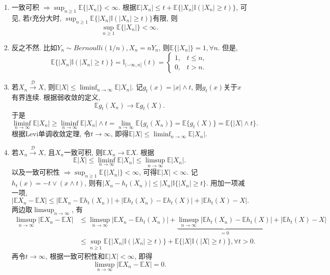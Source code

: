 \documentclass[UTF8, a4paper]{article}
\begin{document}
\begin{enumerate}
    \item 一致可积 \(\Rightarrow \sup_{n\geq 1} \mathbb{E}\{|X_n|\} < \infty.\) 根据\(\mathbb{E}|X_n| \leq t + \mathbb{E}\{|X_n| \mathbb{I}(|X_n| \geq t)\}\), 
    可见, 若\(t\)充分大时, \(\sup_{n\geq 1} \mathbb{E}\{|X_n| \mathbb{I}(|X_n| \geq t)\}\)有限, 
    则
    $$
    \sup_{n\geq 1} \mathbb{E}\{|X_n|\} < \infty.
    $$
    \item 反之不然. 比如\(Y_n \sim Bernoulli(1/n), X_n = nY_n\), 则\(\mathbb{E}\{|X_n|\} = 1, \forall n\).
    但是, 
    $$
    \mathbb{E}\{|X_n| \mathbb{I}(|X_n| \geq t)\} = \mathbb{I}_{(-\infty, n]}(t) = \begin{cases}
        1, & t \leq n, \\
        0, & t > n.
    \end{cases}
    $$
    \item 若\(X_n \xrightarrow{\mathcal{D}} X\), 则\(\mathbb{E}|X| \leq \liminf_{n\to\infty} \mathbb{E}|X_n|\). 
    记\(g_t(x) = |x| \land t\), 则\(g_t(x)\)关于\(x\)有界连续. 根据弱收敛的定义, 
    $$
    \mathbb{E}g_t(X_n) \to \mathbb{E}g_t(X).
    $$
    于是 
    $$
    \liminf_{n\to\infty} \mathbb{E}|X_n| \geq \liminf_{n\to\infty} \mathbb{E}{|X_n| \land t} = \lim_{n\to\infty} \mathbb{E}\{g_t(X_n)\} = \mathbb{E}\{g_t(X)\}= \mathbb{E}\{|X| \land t\}.
    $$
    根据Levi单调收敛定理, 令\(t\to \infty\), 即得\(\mathbb{E}|X| \leq \liminf_{n\to\infty} \mathbb{E}|X_n|\).
    \item 若\(X_n \xrightarrow{\mathcal{D}} X\), 且\(X_n\)一致可积, 则\(\mathbb{E}X_n \to \mathbb{E}X\).
    根据$$
    \mathbb{E}|X| \leq \liminf_{n\to\infty} \mathbb{E}|X_n| \leq \limsup_{n\to\infty} \mathbb{E}|X_n|.
    $$
    以及一致可积性 \(\Rightarrow \sup_{n\geq 1} \mathbb{E}\{|X_n|\} < \infty\), 
    可得\(\mathbb{E}|X| < \infty\).
    记\(h_t(x) = -t \lor (x \land t)\), 则有\(|X_n - h_t(X_n)| \leq |X_n| \mathbb{I}\{|X_n| \geq t\}\).
    用加一项减一项, 
    $$
    |\mathbb{E}X_n - \mathbb{E}X| \leq |\mathbb{E}X_n - \mathbb{E}h_t(X_n)| + |\mathbb{E}h_t(X_n) - \mathbb{E}h_t(X)| + |\mathbb{E}h_t(X) - X|.
    $$
    两边取\(\limsup_{n\to\infty}\), 有 
    $$
    \begin{aligned}
        \limsup_{n\to\infty}|\mathbb{E}X_n - \mathbb{E}X| &\leq \limsup_{n\to\infty}|\mathbb{E}X_n - \mathbb{E}h_t(X_n)| + \underset{=0}{\underbrace{\limsup_{n\to\infty}|\mathbb{E}h_t(X_n) - \mathbb{E}h_t(X)|}} + |\mathbb{E}h_t(X) - X| \\
        &\leq \sup_{n\geq 1} \mathbb{E}\{|X_n| \mathbb{I}(|X_n| \geq t)\} + \mathbb{E}\{|X| \mathbb{I}(|X| \geq t)\}, \forall t > 0.
    \end{aligned}
    $$
    再令\(t\to \infty\), 根据一致可积性和\(\mathbb{E}|X| < \infty\), 即得 
    $$
    \limsup_{n\to\infty}|\mathbb{E}X_n - \mathbb{E}X| = 0.
    $$
\end{enumerate}




\end{document}
